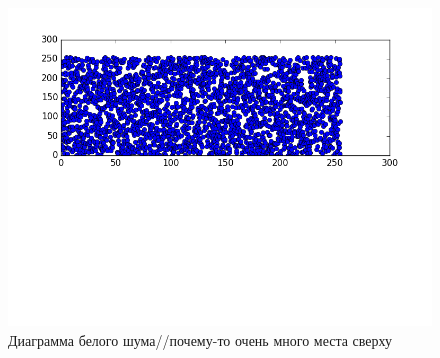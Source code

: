 \begin{figure}[H]
	\centering
    \includegraphics[width=\textwidth]{img/2_white_noise.png}
	\caption{Диаграмма белого шума//почему-то очень много места сверху}
	\label{fig:spire05}
\end{figure}

